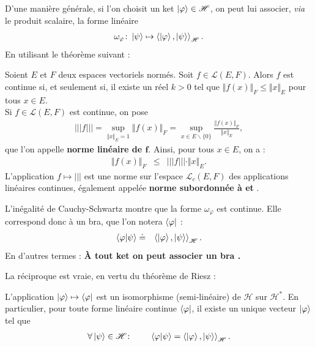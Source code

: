 D'une manière générale, si l'on choisit un ket $\ket{\varphi} \in \mathscr H$, on peut lui associer, {\em via} le produit scalaire, la forme linéaire 
\begin{eqnarray}
    \omega_\varphi \colon \ket{\psi} \mapsto \braket{ \ket{\varphi} , \ket{\psi}}_{\mathscr H}.
\end{eqnarray}
En utilisant le théorème suivant :
\begin{Theo}
    Soient $E$ et $F$ deux espaces vectoriels normés. Soit $f \in \mathcal L(E , F)$. Alors $f$ est continue si, et seulement si, il existe un réel $k>0$ tel que $\Vert f(x) \Vert_F \leq  \Vert x \Vert_E $ pour tous $x \in E$.\\

    Si $f \in \mathcal L(E,F)$ est continue, on pose 
    \begin{eqnarray}
        \vert\!\vert\!\vert f \vert\!\vert\!\vert  = \sup_{\Vert x \Vert_E = 1}\Vert f(x) \Vert_F = \sup_{x \in E \backslash \{0\}} \frac{\Vert f(x) \Vert_F }{\Vert x \Vert_E},
    \end{eqnarray}
    que l'on appelle {\bf norme linéaire de $\bm{f}$}. Ainsi, pour tous $x \in E$, on a :
    \begin{eqnarray}
        \Vert f(x) \Vert_F & \leq  & \vert\!\vert\!\vert f \vert\!\vert\!\vert \cdot \Vert x \Vert_E.
    \end{eqnarray}
    L'application $f \mapsto \vert\!\vert\!\vert$ est une norme sur l'espace $\mathscr L_c(E,F)$ des applications linéaires continues, également appelée {\bf norme subordonnée à  et }.
\end{Theo}

L'inégalité de Cauchy-Schwartz montre que la forme $\omega_\varphi$ est continue. Elle correspond donc à un bra, que l'on notera $\bra{\varphi}$ :
\begin{eqnarray}
    \braket{\varphi \vert \psi } & \doteq &  \braket{ \ket{\varphi} ,  \ket{\psi} }_{\mathscr H}.
\end{eqnarray}
En d'autres termes : {\bf À tout ket  on peut associer un bra .}

\smallskip

La réciproque est vraie, en vertu du théorème de Riesz :

\begin{Theo}
    L'application $\ket{\varphi} \mapsto \bra{\varphi}$ est un isomorphisme (semi-linéaire) de $\mathscr H$ sur $\mathscr H^\ast$. En particulier, pour toute forme linéaire continue $\bra{\varphi}$, il existe un unique vecteur $\ket{\varphi}$ tel que 
    \begin{eqnarray}
    \forall \ket{\psi} \in \mathscr H \colon \qquad \braket{\varphi \vert \psi }  =   \braket{ \ket{\varphi} ,  \ket{\psi} }_{\mathscr H}.
    \end{eqnarray}  
\end{Theo}

